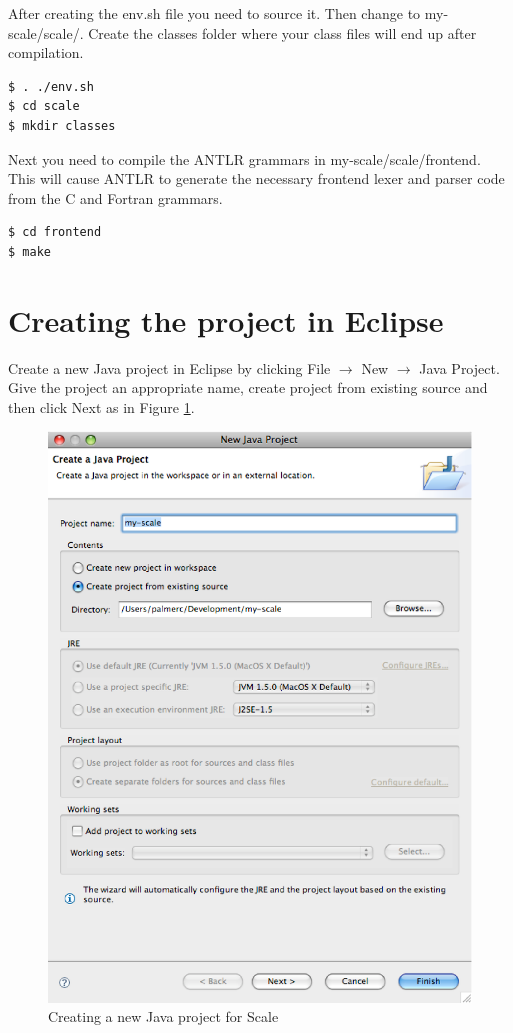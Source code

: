 \documentclass[12pt,twoside,letterpaper]{article}
\begin{document}
After creating the env.sh file you need to source it. Then change to my-scale/scale/. Create the classes folder where your class files will end up after compilation.
\begin{verbatim}
$ . ./env.sh
$ cd scale
$ mkdir classes
\end{verbatim}

Next you need to compile the ANTLR grammars in my-scale/scale/frontend. This will cause ANTLR to generate the necessary frontend lexer and parser code from the C and Fortran grammars.
\begin{verbatim}
$ cd frontend
$ make
\end{verbatim}

\section*{Creating the project in Eclipse}
Create a new Java project in Eclipse by clicking File $\rightarrow$ New $\rightarrow$ Java Project. Give the project an appropriate name, create project from existing source and then click Next as in Figure \ref{fig:create_java_project}.
\begin{figure}[htp]
\includegraphics[width=150mm]{create_java_project.eps}
\caption{Creating a new Java project for Scale}\label{fig:create_java_project}
\end{figure}
\end{document}
